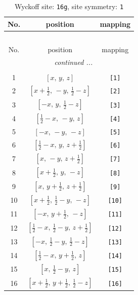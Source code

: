 \documentclass[fleqn,8pt]{jsarticle}
\begin{document}
\begin{longtable}{ccc}
\caption{Wyckoff site: {\tt 16g}, site symmetry: {\tt 1}}
 \\
 \hline \hline
No. & position & mapping \\ \hline \endfirsthead

\multicolumn{2}{l}{\tablename\ \thetable{}} \\
 \hline \hline
No. & position & mapping \\ \hline \endhead

 \hline \hline
\multicolumn{2}{r}{\footnotesize\it continued ...} \\ \endfoot

 \hline \hline
\multicolumn{2}{r}{} \\ \endlastfoot

1 & $\left[ x,\, y,\, z \right]$ & {\tt [1]} \\ \hline
2 & $\left[ x + \frac{1}{2},\, - y,\, \frac{1}{2} - z \right]$ & {\tt [2]} \\ \hline
3 & $\left[ - x,\, y,\, \frac{1}{2} - z \right]$ & {\tt [3]} \\ \hline
4 & $\left[ \frac{1}{2} - x,\, - y,\, z \right]$ & {\tt [4]} \\ \hline
5 & $\left[ - x,\, - y,\, - z \right]$ & {\tt [5]} \\ \hline
6 & $\left[ \frac{1}{2} - x,\, y,\, z + \frac{1}{2} \right]$ & {\tt [6]} \\ \hline
7 & $\left[ x,\, - y,\, z + \frac{1}{2} \right]$ & {\tt [7]} \\ \hline
8 & $\left[ x + \frac{1}{2},\, y,\, - z \right]$ & {\tt [8]} \\ \hline
9 & $\left[ x,\, y + \frac{1}{2},\, z + \frac{1}{2} \right]$ & {\tt [9]} \\ \hline
10 & $\left[ x + \frac{1}{2},\, \frac{1}{2} - y,\, - z \right]$ & {\tt [10]} \\ \hline
11 & $\left[ - x,\, y + \frac{1}{2},\, - z \right]$ & {\tt [11]} \\ \hline
12 & $\left[ \frac{1}{2} - x,\, \frac{1}{2} - y,\, z + \frac{1}{2} \right]$ & {\tt [12]} \\ \hline
13 & $\left[ - x,\, \frac{1}{2} - y,\, \frac{1}{2} - z \right]$ & {\tt [13]} \\ \hline
14 & $\left[ \frac{1}{2} - x,\, y + \frac{1}{2},\, z \right]$ & {\tt [14]} \\ \hline
15 & $\left[ x,\, \frac{1}{2} - y,\, z \right]$ & {\tt [15]} \\ \hline
16 & $\left[ x + \frac{1}{2},\, y + \frac{1}{2},\, \frac{1}{2} - z \right]$ & {\tt [16]} \\
\end{longtable}
\end{document}
